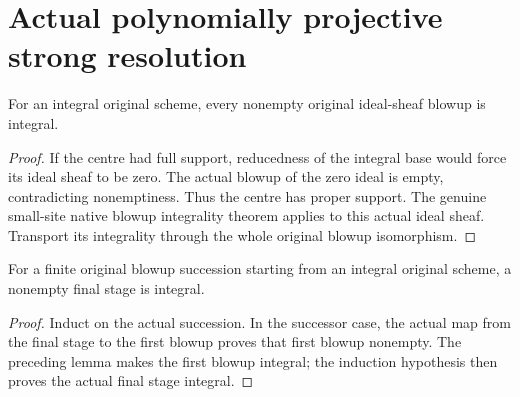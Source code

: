 \section{Actual polynomially projective strong resolution}

\begin{lemma}
\label{lem:fc-nonempty-original-blowup-integral}
\leanok
{}
For an integral original scheme, every nonempty original ideal-sheaf blowup is integral.
\end{lemma}
\begin{proof}
If the centre had full support, reducedness of the integral base would force
its ideal sheaf to be zero.  The actual blowup of the zero ideal is empty,
contradicting nonemptiness.  Thus the centre has proper support.  The genuine
small-site native blowup integrality theorem applies to this actual ideal
sheaf.  Transport its integrality through the whole original blowup isomorphism.
\end{proof}

\begin{lemma}
\label{lem:fc-nonempty-original-blowup-sequence-integral}
\leanok
{}
For a finite original blowup succession starting from an integral original
scheme, a nonempty final stage is integral.
\end{lemma}
\begin{proof}
Induct on the actual succession.  In the successor case, the actual map from
the final stage to the first blowup proves that first blowup nonempty.  The
preceding lemma makes the first blowup integral; the induction hypothesis
then proves the actual final stage integral.
\end{proof}

